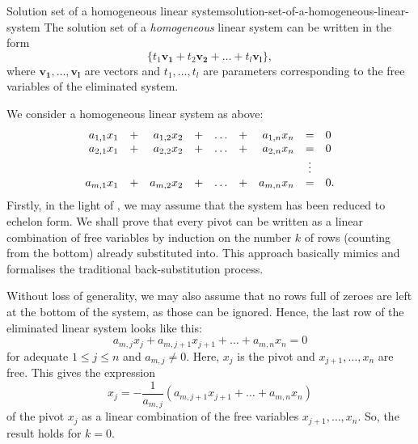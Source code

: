 \begin{proposition}{Solution set of a homogeneous linear system}{solution-set-of-a-homogeneous-linear-system}
 The solution set of a \emph{homogeneous} linear system can be written in the
 form
 \[
  \{t_1 \mathbf{v_1} + t_2 \mathbf{v_2} + \ldots + t_l\mathbf{v_l}\},
 \]
 where $\mathbf{v_1},\ldots,\mathbf{v_l}$ are vectors and $t_1,\ldots,t_l$ are
 parameters corresponding to the free variables of the eliminated system.
\end{proposition}
\begin{propproof}
 We consider a homogeneous linear system as above:
\begin{equation}
 \label{eq:hom-lin-sys}
 \begin{array}{r c r c c c r c l}
  a_{1,1}x_1 & + & a_{1,2}x_2 & + & \ldots & + & a_{1,n}x_n & = & 0\\
  a_{2,1}x_1 & + & a_{2,2}x_2 & + & \ldots & + & a_{2,n}x_n & = & 0\\
            &   &           &   &        &   &           & \vdots & \\
  a_{m,1}x_1 & + & a_{m,2}x_2 & + & \ldots & + & a_{m,n}x_n & = & 0.
 \end{array}
\end{equation}
 Firstly, in the light of , we may assume that
 the system has been reduced to echelon form. We shall prove that every pivot
 can be written as a linear combination of free variables by induction on the
 number $k$ of rows (counting from the bottom) already substituted into. This
 approach basically mimics and formalises the traditional back-substitution
 process.

 Without loss of generality, we may also assume that no rows full of zeroes are
 left at the bottom of the system, as those can be ignored. Hence, the last row
 of the eliminated linear system looks like this:
 \[
  a_{m,j}x_j + a_{m,j+1}x_{j+1} + \ldots + a_{m,n}x_n = 0
 \]
 for adequate $1 \leq j \leq n$ and $a_{m,j} \neq 0$. Here, $x_j$ is the pivot
 and $x_{j+1},\ldots,x_n$ are free. This gives the expression
 \[
  x_j = -\frac{1}{a_{m,j}}(a_{m,j+1}x_{j+1} + \ldots + a_{m,n}x_n)
 \]
 of the pivot $x_j$ as a linear combination of the free variables
 $x_{j+1},\ldots,x_n$. So, the result holds for $k = 0$.


\end{propproof}
